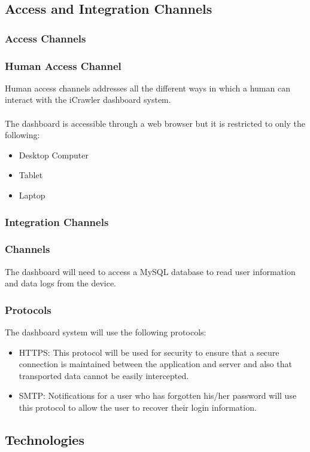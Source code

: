 \documentclass[hidelinks, 12pt, oneside]{article}
\begin{document}
	\subsection{Access and Integration Channels}
	\subsubsection{Access Channels}
	\subsubsection*{Human Access Channel}
	Human access channels addresses all the different ways in which a human can interact with the iCrawler dashboard system.\\\\ The dashboard is accessible through a web browser but it is restricted to only the following: 
	\begin{itemize}
		\item Desktop Computer
		\item Tablet
		\item Laptop  
	\end{itemize}
	\subsubsection{Integration Channels}
	\subsubsection*{Channels}
	The dashboard will need to access a MySQL database to read user information and data logs from the device. 
	\subsubsection*{Protocols}
	The dashboard system will use the following protocols:
	\begin{itemize}
	\item HTTPS: This protocol will be used for security to ensure that a secure connection is maintained between the application and server and also that transported data cannot be easily intercepted.
	\item SMTP: Notifications for a user who has forgotten his/her password will use this protocol to allow the user  to recover their login information.  
	\end{itemize}	 
	\newpage
	\subsection{Technologies}
\end{document}
